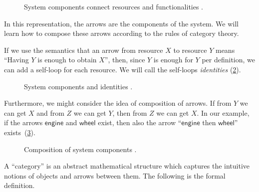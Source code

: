 \begin{figure}[h!]
    \centering
    \caption{System components connect resources and functionalities \label{fig:e2}.}
\end{figure}

In this representation, the arrows are the components of the system.
We will learn how to compose these arrows according to the rules of category theory.

If we use the semantics that an arrow from resource $X$ to resource $Y$ means ``Having $Y$ is
enough to obtain $X$'', then, since $Y$ is enough for $Y$ per definition, we can add a self-loop for each
resource. We will call the self-loops \emph{identities} (\cref{fig:e3}).

\begin{figure}[h!]
    \centering
    \caption{System components and identities \label{fig:e3}.}
\end{figure}

Furthermore, we might consider the idea of composition of arrows. If from $Y$ we
can get $X$ and from $Z$ we can get $Y$, then from $Z$ we can get $X$. In our
example, if the arrows $\mathsf{engine}$ and $\mathsf{wheel}$  exist, then also the arrow ``$\mathsf{engine}$ then $\mathsf{wheel}$''
exists~(\cref{fig:e4}).

\begin{figure}[h!]
    \centering
    
    \caption{Composition of system components \label{fig:e4}.}
\end{figure}

A ``category'' is an abstract mathematical
structure which captures the intuitive notions of objects and arrows between them.
The following is the formal definition.

